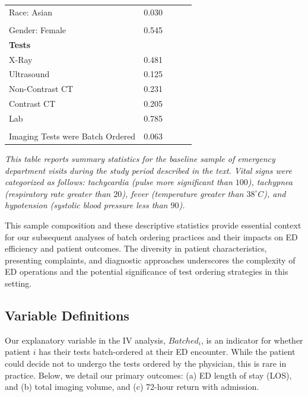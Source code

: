 \documentclass{article}
\begin{document}
\begin{table}[ht]
\begin{tabular}{p{10.5cm}cccc}
Race: Asian & 0.030 & & & \\
\\
Gender: Female & 0.545 & & & \\
\midrule
\multicolumn{5}{l}{\textbf{Tests}} \\
X-Ray & 0.481 & & & \\
Ultrasound & 0.125 & & & \\
Non-Contrast CT & 0.231 & & & \\
Contrast CT & 0.205 & & & \\
Lab & 0.785 & & & \\
\\
Imaging Tests were Batch Ordered & 0.063 & & & \\
\bottomrule
\end{tabular}
\begin{tablenotes}
\small
\item \textit{This table reports summary statistics for the baseline sample of emergency department visits during the study period described in the text. Vital signs were categorized as follows: tachycardia (pulse more significant than $100$), tachypnea (respiratory rate greater than $20$), fever (temperature greater than $38^\circ C$), and hypotension (systolic blood pressure less than $90$).}
\end{tablenotes}
\end{table}

This sample composition and these descriptive statistics provide
essential context for our subsequent analyses of batch ordering
practices and their impacts on ED efficiency and patient outcomes. The
diversity in patient characteristics, presenting complaints, and
diagnostic approaches underscores the complexity of ED operations and
the potential significance of test ordering strategies in this setting.

\hypertarget{variable-definitions}{%
\subsection{Variable Definitions}\label{variable-definitions}}

Our explanatory variable in the IV analysis, \(Batched_i\), is an
indicator for whether patient \(i\) has their tests batch-ordered at
their ED encounter. While the patient could decide not to undergo the
tests ordered by the physician, this is rare in practice. Below, we
detail our primary outcomes: (a) ED length of stay (LOS), and (b) total
imaging volume, and (c) 72-hour return with admission.
\end{document}
